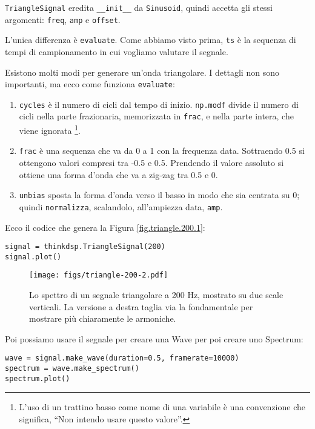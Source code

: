 \documentclass[12pt,a4paper]{book}
\begin{document}
{\tt TriangleSignal} eredita \verb"__init__" da {\tt Sinusoid}, quindi accetta gli stessi argomenti: {\tt freq}, {\tt amp} e {\tt offset}.

L'unica differenza è {\tt evaluate}. Come abbiamo visto prima, {\tt ts} è la sequenza di tempi di campionamento in cui vogliamo valutare il segnale.

Esistono molti modi per generare un'onda triangolare. I dettagli non sono importanti, ma ecco come funziona {\tt evaluate}:

\begin{enumerate} 

\item {\tt cycles} è il numero di cicli dal tempo di inizio. {\tt np.modf} divide il numero di cicli nella parte frazionaria, memorizzata in {\tt frac}, e nella parte intera, che viene ignorata \footnote{L'uso di un trattino basso come nome di una variabile è una convenzione che significa, ``Non intendo usare questo valore''.}.

\item {\tt frac} è una sequenza che va da 0 a 1 con la frequenza data. Sottraendo 0.5 si ottengono valori compresi tra -0.5 e 0.5. Prendendo il valore assoluto si ottiene una forma d'onda che va a zig-zag tra 0.5 e 0.

\item {\tt unbias} sposta la forma d'onda verso il basso in modo che sia centrata su 0; quindi {\tt normalizza}, scalandolo, all'ampiezza data, {\tt amp}.

\end{enumerate} 

Ecco il codice che genera la Figura \ref{fig.triangle.200.1}:

\begin{verbatim} 
signal = thinkdsp.TriangleSignal(200)
signal.plot()
 \end{verbatim} 

\begin{figure} 

\centerline{\texttt{[image: figs/triangle-200-2.pdf]}} \caption{Lo spettro di un segnale triangolare a 200 Hz, mostrato su due scale verticali. La versione a destra taglia via la fondamentale per mostrare più chiaramente le armoniche.} \label{fig.triangle.200.2} \end{figure} 

Poi possiamo usare il segnale per creare una Wave per poi creare uno Spectrum:

\begin{verbatim} 
wave = signal.make_wave(duration=0.5, framerate=10000)
spectrum = wave.make_spectrum()
spectrum.plot()
 \end{verbatim} 
\end{document}
